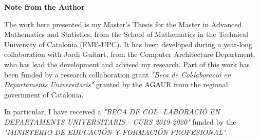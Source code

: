 \vspace*{4cm}
\Huge
\textbf{Note from the Author} \label{sec:acknowledgments}
\normalsize

\vspace{1cm}

The work here presented is my Master's Thesis for the Master in Advanced Mathematics and Statistics, from the School of Mathematics in the Technical University of Catalonia (FME-UPC).
It has been developed during a year-long collaboration with Jordi Guitart, from the Computer Architecture Department, who has lead the development and advised my research.
Part of this work has been funded by a research collaboration grant \textit{"Beca de Col$\cdot$laboraci\'o en Departaments Universitaris"} granted by the AGAUR from the regional government of Catalonia.

In particular, I have received a \textit{"BECA DE COL·LABORACI\'O EN DEPARTAMENTS UNIVERSITARIS - CURS 2019-2020"} funded by the \textit{"MINISTERIO DE EDUCACIÓN Y FORMACIÓN PROFESIONAL"}.

%
%

\vspace*{\fill}
